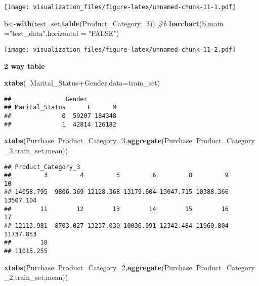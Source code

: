 \documentclass[]{article}
\newenvironment{Shaded}{\begin{snugshade}}{\end{snugshade}}
\newcommand{\KeywordTok}[1]{\textcolor[rgb]{0.13,0.29,0.53}{\textbf{#1}}}
\newcommand{\DataTypeTok}[1]{\textcolor[rgb]{0.13,0.29,0.53}{#1}}
\newcommand{\DecValTok}[1]{\textcolor[rgb]{0.00,0.00,0.81}{#1}}
\newcommand{\StringTok}[1]{\textcolor[rgb]{0.31,0.60,0.02}{#1}}
\newcommand{\CommentTok}[1]{\textcolor[rgb]{0.56,0.35,0.01}{\textit{#1}}}
\newcommand{\OperatorTok}[1]{\textcolor[rgb]{0.81,0.36,0.00}{\textbf{#1}}}
\newcommand{\NormalTok}[1]{#1}
\begin{document}
\texttt{[image: visualization\_files/figure-latex/unnamed-chunk-11-1.pdf]}

\begin{Shaded}
\begin{Highlighting}[]
\NormalTok{b<-}\KeywordTok{with}\NormalTok{(test_set,}\KeywordTok{table}\NormalTok{(Product_Category_}\DecValTok{3}\NormalTok{))}
\CommentTok{#b}
\KeywordTok{barchart}\NormalTok{(b,}\DataTypeTok{main =}\StringTok{"test_data"}\NormalTok{,}\DataTypeTok{horizontal =} \StringTok{"FALSE"}\NormalTok{)}
\end{Highlighting}
\end{Shaded}

\texttt{[image: visualization\_files/figure-latex/unnamed-chunk-11-2.pdf]}

\textbf{2 way table}

\begin{Shaded}
\begin{Highlighting}[]
\KeywordTok{xtabs}\NormalTok{(}\OperatorTok{~}\NormalTok{Marital_Status}\OperatorTok{+}\NormalTok{Gender,}\DataTypeTok{data=}\NormalTok{train_set)}
\end{Highlighting}
\end{Shaded}

\begin{verbatim}
##               Gender
## Marital_Status      F      M
##              0  59207 184348
##              1  42814 126182
\end{verbatim}

\begin{Shaded}
\begin{Highlighting}[]
\KeywordTok{xtabs}\NormalTok{(Purchase}\OperatorTok{~}\NormalTok{Product_Category_}\DecValTok{3}\NormalTok{,}\KeywordTok{aggregate}\NormalTok{(Purchase}\OperatorTok{~}\NormalTok{Product_Category_}\DecValTok{3}\NormalTok{,train_set,mean))}
\end{Highlighting}
\end{Shaded}

\begin{verbatim}
## Product_Category_3
##         3         4         5         6         8         9        10 
## 14058.795  9806.369 12128.368 13179.604 13047.715 10388.366 13507.104 
##        11        12        13        14        15        16        17 
## 12113.981  8703.027 13237.030 10036.091 12342.484 11960.804 11737.853 
##        18 
## 11015.255
\end{verbatim}

\begin{Shaded}
\begin{Highlighting}[]
\KeywordTok{xtabs}\NormalTok{(Purchase}\OperatorTok{~}\NormalTok{Product_Category_}\DecValTok{2}\NormalTok{,}\KeywordTok{aggregate}\NormalTok{(Purchase}\OperatorTok{~}\NormalTok{Product_Category_}\DecValTok{2}\NormalTok{,train_set,mean))}
\end{Highlighting}
\end{Shaded}
\end{document}
